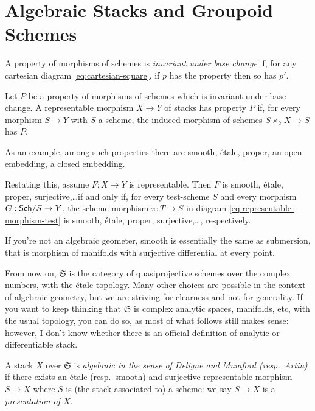 \documentclass[12pt]{memoir}
\begin{document}
\section{Algebraic Stacks and Groupoid Schemes}

A property of morphisms of schemes is \emph{invariant under base change} if, for any cartesian diagram \eqref{eq:cartesian-square}, if $p$ has the property then so has $p'$.

\begin{Def}\label{def:5.1}
Let $P$ be a property of morphisms of schemes which is invariant under base change. A representable morphism $X \to Y$ of stacks has property $P$ if, for every morphism $S \to Y$ with $S$ a scheme, the induced morphism of schemes $S \times_Y X \to S$ has $P$.
\end{Def}


As an example, among such properties there are smooth, \'etale, proper, an open embedding, a closed embedding. 

\begin{ptcb}
    Restating this, assume \(F:X\to Y\) is representable. Then \(F\) is smooth, étale, proper, surjective,\dots if and only if, for every test-scheme \(S\) and every morphism \(G:\mathsf{Sch}/S\to Y\), the scheme morphism \(\pi:T\to S\) in diagram \eqref{eq:representable-morphism-test} is smooth, étale, proper, surjective,\dots, respectively.
\end{ptcb}

If you're not an algebraic geometer, smooth is essentially the same as submersion, that is morphism of manifolds with surjective differential at every point.

From now on, $\mathfrak{S}$ is the category of quasiprojective schemes over the complex numbers, with the \'etale topology. Many other choices are possible in the context of algebraic geometry, but we are striving for clearness and not for generality. If you want to keep thinking that $\mathfrak{S}$ is complex analytic spaces, manifolds, etc, with the usual topology, you can do so, as most of what follows still makes sense: however, I don't know whether there is an official definition of analytic or differentiable stack.

\begin{Def}\label{def:5.2}
A stack $X$ over $\mathfrak{S}$ is \emph{algebraic in the sense of Deligne and Mumford (resp.\ Artin)} if there exists an \'etale (resp.\ smooth) and surjective representable morphism $S \to X$ where $S$ is (the stack associated to) a scheme: we say $S \to X$ is a \emph{presentation of $X$}.
\end{Def}
\end{document}
